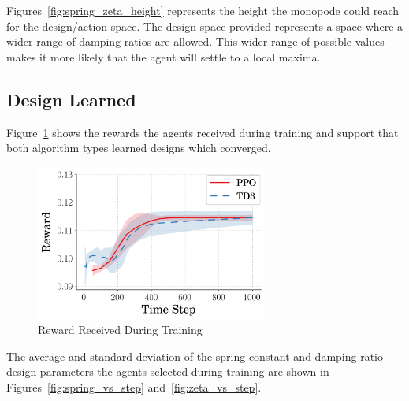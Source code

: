 \documentclass[10pt,twocolumn,letterpaper]{article}
\begin{document}
Figures~\ref{fig:spring_zeta_height} represents the height the monopode could reach for the design/action space. The design space provided represents a space where a wider range of damping ratios are allowed. This wider range of possible values makes it more likely that the agent will settle to a local maxima. 

\subsection{Design Learned}

Figure~\ref{fig:rew_vs_step} shows the rewards the agents received during training and support that both algorithm types learned designs which converged. 
%
\begin{figure}[t]
        \begin{center}
        \includegraphics[width = 3in]{figures/ppo_vs_td3/avg_rew_comp.png}  
        \caption{Reward Received During Training}
        \label{fig:rew_vs_step}
        \end{center}
        \end{figure}
%

The average and standard deviation of the spring constant and damping ratio design parameters the agents selected during training are shown in Figures~\ref{fig:spring_vs_step} and~\ref{fig:zeta_vs_step}. 
\end{document}
